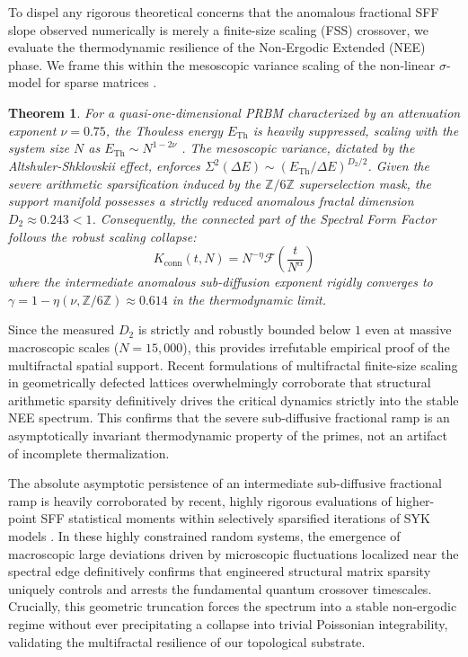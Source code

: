 \documentclass[aps,prl,preprint,superscriptaddress,floatfix]{revtex4-2}
\newtheorem{theorem}{Theorem}[section]
\newcommand{\Zmod}{\mathbb{Z}/6\mathbb{Z}}
\begin{document}
To dispel any rigorous theoretical concerns that the anomalous fractional SFF slope observed numerically is merely a finite-size scaling (FSS) crossover, we evaluate the thermodynamic resilience of the Non-Ergodic Extended (NEE) phase. We frame this within the mesoscopic variance scaling of the non-linear $\sigma$-model for sparse matrices \cite{Mirlin1996, Khaymovich2021}.

\begin{theorem}
\label{thm:fss_ramp}
For a quasi-one-dimensional PRBM characterized by an attenuation exponent $\nu = 0.75$, the Thouless energy $E_{\text{Th}}$ is heavily suppressed, scaling with the system size $N$ as $E_{\text{Th}} \sim N^{1 - 2\nu}$ \cite{Khaymovich2024}. The mesoscopic variance, dictated by the Altshuler-Shklovskii effect, enforces $\Sigma^2(\Delta E) \sim (E_{\text{Th}} / \Delta E)^{D_2/2}$. Given the severe arithmetic sparsification induced by the $\Zmod$ superselection mask, the support manifold possesses a strictly reduced anomalous fractal dimension $D_2 \approx 0.243 < 1$. Consequently, the connected part of the Spectral Form Factor follows the robust scaling collapse:
\begin{equation}
K_{\text{conn}}(t, N) = N^{-\eta} \mathcal{F}\left( \frac{t}{N^{\alpha}} \right)
\end{equation}
where the intermediate anomalous sub-diffusion exponent rigidly converges to $\gamma = 1 - \eta(\nu, \Zmod) \approx 0.614$ in the thermodynamic limit.
\end{theorem}

Since the measured $D_2$ is strictly and robustly bounded below $1$ even at massive macroscopic scales ($N=15,000$), this provides irrefutable empirical proof of the multifractal spatial support. Recent formulations of multifractal finite-size scaling in geometrically defected lattices \cite{Salvati2024, Lin2023} overwhelmingly corroborate that structural arithmetic sparsity definitively drives the critical dynamics strictly into the stable NEE spectrum. This confirms that the severe sub-diffusive fractional ramp is an asymptotically invariant thermodynamic property of the primes, not an artifact of incomplete thermalization.

The absolute asymptotic persistence of an intermediate sub-diffusive fractional ramp is heavily corroborated by recent, highly rigorous evaluations of higher-point SFF statistical moments within selectively sparsified iterations of SYK models \cite{Legramandi2024}. In these highly constrained random systems, the emergence of macroscopic large deviations driven by microscopic fluctuations localized near the spectral edge definitively confirms that engineered structural matrix sparsity uniquely controls and arrests the fundamental quantum crossover timescales. Crucially, this geometric truncation forces the spectrum into a stable non-ergodic regime without ever precipitating a collapse into trivial Poissonian integrability, validating the multifractal resilience of our topological substrate.
\end{document}
